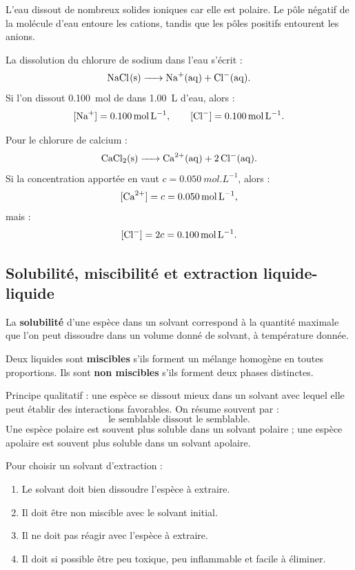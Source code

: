 \documentclass[11pt,a4paper]{article}
\begin{document}
\begin{propositionbox}
L'eau dissout de nombreux solides ioniques car elle est polaire. Le pôle négatif de la molécule d'eau entoure les cations, tandis que les pôles positifs entourent les anions.
\end{propositionbox}

\begin{exemplebox}
La dissolution du chlorure de sodium dans l'eau s'écrit :
\[
\ce{NaCl(s) -> Na+(aq) + Cl-(aq)}.
\]
Si l'on dissout \SI{0.100}{mol} de  dans \SI{1.00}{L} d'eau, alors :
\[
[\ce{Na+}]=\SI{0.100}{mol.L^{-1}},\qquad [\ce{Cl-}]=\SI{0.100}{mol.L^{-1}}.
\]
\end{exemplebox}

\begin{exemplebox}
Pour le chlorure de calcium :
\[
\ce{CaCl2(s) -> Ca^{2+}(aq) + 2Cl-(aq)}.
\]
Si la concentration apportée en  vaut $c=\SI{0.050}{mol.L^{-1}}$, alors :
\[
[\ce{Ca^{2+}}]=c=\SI{0.050}{mol.L^{-1}},
\]
mais :
\[
[\ce{Cl-}]=2c=\SI{0.100}{mol.L^{-1}}.
\]
\end{exemplebox}

\subsection{Solubilité, miscibilité et extraction liquide-liquide}

\begin{definitionbox}
La \textbf{solubilité} d'une espèce dans un solvant correspond à la quantité maximale que l'on peut dissoudre dans un volume donné de solvant, à température donnée.
\end{definitionbox}

\begin{definitionbox}
Deux liquides sont \textbf{miscibles} s'ils forment un mélange homogène en toutes proportions. Ils sont \textbf{non miscibles} s'ils forment deux phases distinctes.
\end{definitionbox}

\begin{retenirbox}
Principe qualitatif : une espèce se dissout mieux dans un solvant avec lequel elle peut établir des interactions favorables. On résume souvent par :
\[
\text{le semblable dissout le semblable}.
\]
Une espèce polaire est souvent plus soluble dans un solvant polaire ; une espèce apolaire est souvent plus soluble dans un solvant apolaire.
\end{retenirbox}

\begin{methodbox}
Pour choisir un solvant d'extraction :
\begin{enumerate}
\item Le solvant doit bien dissoudre l'espèce à extraire.
\item Il doit être non miscible avec le solvant initial.
\item Il ne doit pas réagir avec l'espèce à extraire.
\item Il doit si possible être peu toxique, peu inflammable et facile à éliminer.
\end{enumerate}
\end{methodbox}
\end{document}
